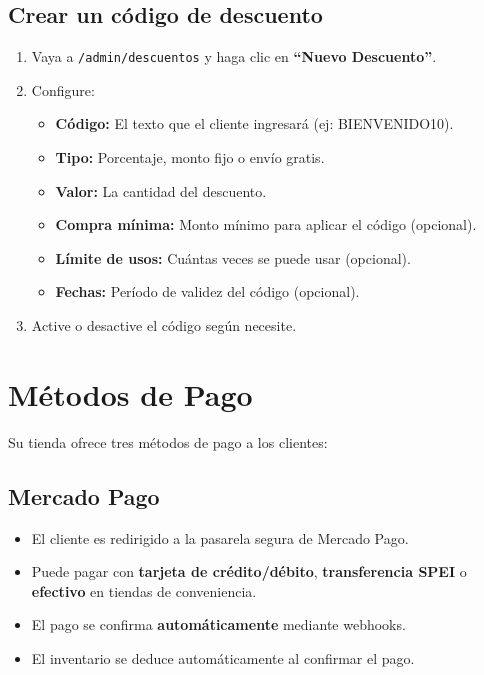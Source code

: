 \documentclass[12pt,a4paper]{article}
\begin{document}
\subsection{Crear un código de descuento}
\begin{enumerate}[leftmargin=2cm]
    \item Vaya a \texttt{/admin/descuentos} y haga clic en \textbf{``Nuevo Descuento''}.
    \item Configure:
    \begin{itemize}
        \item \textbf{Código:} El texto que el cliente ingresará (ej: BIENVENIDO10).
        \item \textbf{Tipo:} Porcentaje, monto fijo o envío gratis.
        \item \textbf{Valor:} La cantidad del descuento.
        \item \textbf{Compra mínima:} Monto mínimo para aplicar el código (opcional).
        \item \textbf{Límite de usos:} Cuántas veces se puede usar (opcional).
        \item \textbf{Fechas:} Período de validez del código (opcional).
    \end{itemize}
    \item Active o desactive el código según necesite.
\end{enumerate}

\section{Métodos de Pago}

Su tienda ofrece tres métodos de pago a los clientes:

\subsection{Mercado Pago}
\begin{itemize}[leftmargin=2cm]
    \item El cliente es redirigido a la pasarela segura de Mercado Pago.
    \item Puede pagar con \textbf{tarjeta de crédito/débito}, \textbf{transferencia SPEI} o \textbf{efectivo} en tiendas de conveniencia.
    \item El pago se confirma \textbf{automáticamente} mediante webhooks.
    \item El inventario se deduce automáticamente al confirmar el pago.
\end{itemize}
\end{document}
